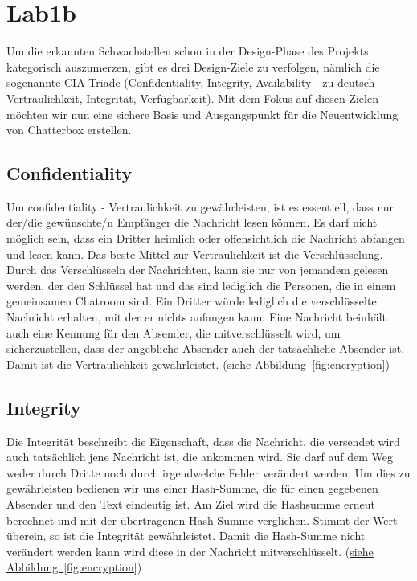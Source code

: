 \documentclass[12pt,a4paper,titlepage,oneside]{scrartcl}
\begin{document}
\section{Lab1b}

Um die erkannten Schwachstellen schon in der Design-Phase des Projekts kategorisch auszumerzen, gibt es drei Design-Ziele zu verfolgen, n\"amlich die sogenannte CIA-Triade (Confidentiality, Integrity, Availability - zu deutsch Vertraulichkeit, Integrit\"at, Verf\"ugbarkeit). Mit dem Fokus auf diesen Zielen m\"ochten wir nun eine sichere Basis und Ausgangspunkt f\"ur die Neuentwicklung von Chatterbox erstellen.

\subsection{Confidentiality}
Um confidentiality - Vertraulichkeit zu gew\"ahrleisten, ist es essentiell, dass nur der/die gew\"unschte/n Empf\"anger die Nachricht lesen k\"onnen. Es darf nicht m\"oglich sein, dass ein Dritter heimlich oder offensichtlich die Nachricht abfangen und lesen kann. Das beste Mittel zur Vertraulichkeit ist die Verschl\"usselung. Durch das Verschl\"usseln der Nachrichten, kann sie nur von jemandem gelesen werden, der den Schl\"ussel hat und das sind lediglich die Personen, die in einem gemeinsamen Chatroom sind. Ein Dritter w\"urde lediglich die verschl\"usselte Nachricht erhalten, mit der er nichts anfangen kann. Eine Nachricht beinh\"alt auch eine Kennung f\"ur den Absender, die mitverschl\"usselt wird, um sicherzustellen, dass der angebliche Absender auch der tats\"achliche Absender ist. Damit ist die Vertraulichkeit gew\"ahrleistet. (\hyperref[fig:encryption]{siehe Abbildung~\ref*{fig:encryption}})

\subsection{Integrity}
Die Integrit\"at beschreibt die Eigenschaft, dass die Nachricht, die versendet wird auch tats\"achlich jene Nachricht ist, die ankommen wird. Sie darf auf dem Weg weder durch Dritte noch durch irgendwelche Fehler ver\"andert werden. Um dies zu gew\"ahrleisten bedienen wir uns einer Hash-Summe, die f\"ur einen gegebenen Absender und den Text eindeutig ist. Am Ziel wird die Hashsumme erneut berechnet und mit der \"ubertragenen Hash-Summe verglichen. Stimmt der Wert \"uberein, so ist die Integrit\"at gew\"ahrleistet. Damit die Hash-Summe nicht ver\"andert werden kann wird diese in der Nachricht mitverschl\"usselt. (\hyperref[fig:encryption]{siehe Abbildung~\ref*{fig:encryption}})
\end{document}
